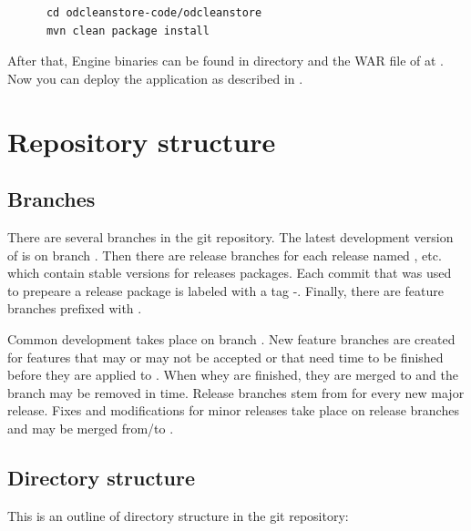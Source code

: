 \begin{verbatim}
      cd odcleanstore-code/odcleanstore
      mvn clean package install
\end{verbatim}

After that, Engine binaries can be found in directory  and the WAR file of \FE at . Now you can deploy the application as described in . 

\section{Repository structure}
\subsection{Branches}
There are several branches in the git repository. The latest development version of is on branch . Then there are release branches for each release named ,  etc. which contain stable versions for  releases  packages. Each commit that was used to prepeare a release package is labeled with a tag -. Finally, there are feature branches prefixed with .

Common development takes place on branch . New feature branches are created for features that may or may not be accepted or that need time to be finished before they are applied to . When whey are finished, they are merged to  and the branch may be removed in time. Release branches stem from  for every new major release. Fixes and modifications for minor releases take place on release branches and may be merged from/to .

\subsection{Directory structure}
This is an outline of directory structure in the git repository:

